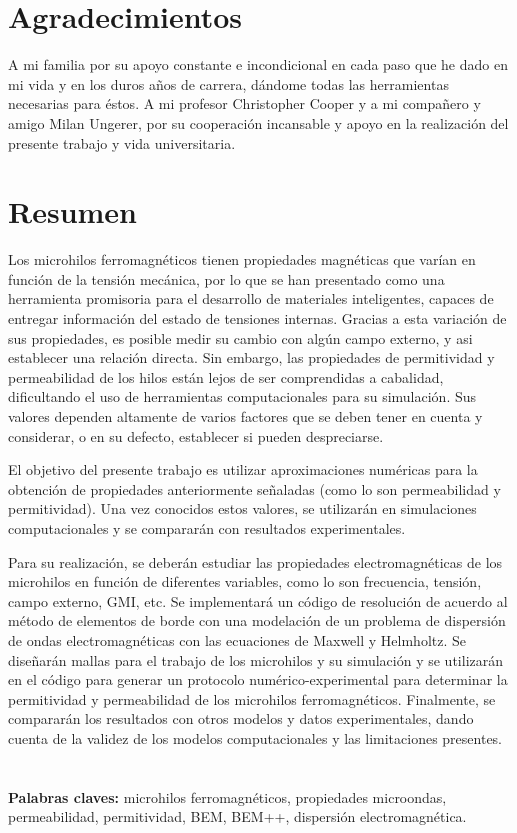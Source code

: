 \documentclass[12pt,letterpaper]{article}
\numberwithin{equation}{section}
\begin{document}
\section*{Agradecimientos}
A mi familia por su apoyo constante e incondicional en cada paso que he dado en mi vida y en los duros años de carrera, dándome todas las herramientas necesarias para éstos. A mi profesor Christopher Cooper y a mi compañero y amigo Milan Ungerer, por su cooperación incansable y apoyo en la realización del presente trabajo y vida universitaria. 

\pagebreak
\section*{Resumen}

Los microhilos ferromagnéticos tienen propiedades magnéticas que varían en función de la tensión mecánica, por lo que se han presentado como una herramienta promisoria para el desarrollo de materiales inteligentes, capaces de entregar información del estado de tensiones internas. Gracias a esta variación de sus propiedades, es posible medir su cambio con algún campo externo, y asi establecer una relación directa. Sin embargo, las propiedades de permitividad y permeabilidad de los hilos están lejos de ser comprendidas a cabalidad, dificultando el uso de herramientas computacionales para su simulación. Sus valores dependen altamente de varios factores que se deben tener en cuenta y considerar, o en su defecto, establecer si pueden despreciarse. 

El objetivo del presente trabajo es utilizar aproximaciones numéricas para la obtención de propiedades anteriormente señaladas (como lo son permeabilidad y permitividad). Una vez conocidos estos valores, se utilizarán en simulaciones computacionales y se compararán con resultados experimentales.

Para su realización, se deberán estudiar las propiedades electromagnéticas de los microhilos en función de diferentes variables, como lo son frecuencia, tensión, campo externo, GMI, etc. Se implementará un código de resolución de acuerdo al método de elementos de borde con una modelación de un problema de dispersión de ondas electromagnéticas con las ecuaciones de Maxwell y Helmholtz. Se diseñarán mallas para el trabajo de los microhilos y su simulación y se utilizarán en el código para generar un protocolo numérico-experimental para determinar la permitividad y permeabilidad de los microhilos ferromagnéticos. Finalmente, se compararán los resultados con otros modelos y datos experimentales, dando cuenta de la validez de los modelos computacionales y las limitaciones presentes.
 \\
 \\
 \\
\noindent \textbf{Palabras claves:} microhilos ferromagnéticos, propiedades microondas, permeabilidad, permitividad, BEM, BEM++, dispersión electromagnética.
\end{document}
